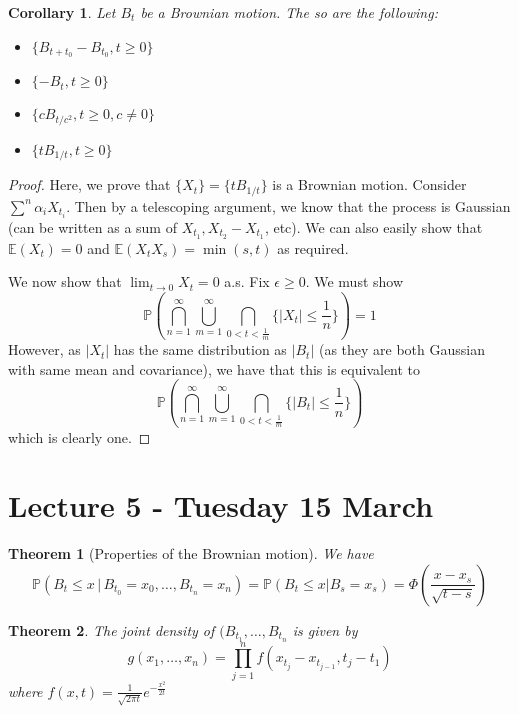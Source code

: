 \documentclass[10pt, oneside, reqno]{amsart}
\theoremstyle{plain}%
\newtheorem{thm}{Theorem}[section]
\newtheorem*{cor}{Corollary}
\theoremstyle{definition}
\theoremstyle{remark}
\renewcommand{\P}{\mathbb{P}}
\newcommand{\E}{\mathbb{E}}
\begin{document}
\begin{cor}
	Let $B_t$ be a Brownian motion.  The so are the following:
	\begin{itemize}
		\item $\{ B_{t + t_0} - B_{t_0}, t \geq 0 \}$
		\item $\{ -B_t, t \geq 0 \}$
		\item $\{ c B_{t/c^2}, t \geq 0, c \neq 0 \}$
		\item $\{ t B_{1/t} , t \geq 0 \}$
	\end{itemize}
\end{cor}

\begin{proof} Here, we prove that $\{ X_t \} = \{ t B_{1/t} \}$ is a Brownian motion.  Consider $\sum^n \alpha_i X_{t_i}$.  Then by a telescoping argument, we know that the process is Gaussian (can be written as a sum of $X_{t_1}, X_{t_2} - X_{t_1}$, etc).  We can also easily show that $\E(X_t) = 0$ and $\E(X_t X_s) = \min(s,t)$ as required.   
	
We now show that $\lim_{t \rightarrow 0} X_t = 0$ a.s. Fix $\epsilon \geq 0$.  We must show \[
	\P \left( \bigcap_{n=1}^\infty \bigcup_{m = 1}^\infty \bigcap_{0 < t < \frac{1}{m}} \{ |X_t | \leq \frac{1}{n} \} \right) = 1
\]
However, as $|X_t|$ has the same distribution as $|B_t|$ (as they are both Gaussian with same mean and covariance), we have that this is equivalent to \[
		\P \left( \bigcap_{n=1}^\infty \bigcup_{m = 1}^\infty \bigcap_{0 < t < \frac{1}{m}} \{ |B_t | \leq \frac{1}{n} \} \right)
\] which is clearly one.

\end{proof}

\section{Lecture 5 - Tuesday 15 March} %
\label{sec:lecture_5_tuesday_15_march}

\begin{thm}[Properties of the Brownian motion]
	We have \[
		\P( B_t \leq x \, | \, B_{t_0} = x_0, \dots, B_{t_n} = x_n ) = \P(B_t \leq x | B_s = x_s) = \Phi( \frac{x - x_s}{\sqrt{t-s}})
	\] 
\end{thm}

\begin{thm}
	The joint density of $(B_{t_1}, \dots, B_{t_n}$ is given by \[
		g(x_1, \dots, x_n) = \prod_{j=1}^n f(x_{t_j} - x_{t_{j-1}}, t_j - t_1)
	\] where $f(x,t) = \frac{1}{\sqrt{2 \pi t}} e^{-\frac{x^2}{2t}}$
\end{thm}
\end{document}
